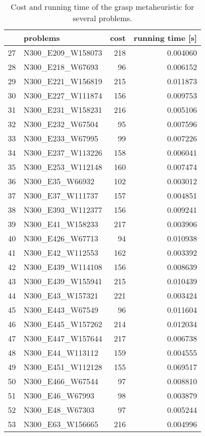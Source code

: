 \begin{table}[H]
\centering
\begin{tabular}{llrr}
\toprule
{} &            problems &  cost &  running time [s] \\
\midrule
27 &   N300\_E209\_W158073 &   218 &          0.004060 \\
28 &    N300\_E218\_W67693 &    96 &          0.006152 \\
29 &   N300\_E221\_W156819 &   215 &          0.011873 \\
30 &   N300\_E227\_W111874 &   156 &          0.009753 \\
31 &   N300\_E231\_W158231 &   216 &          0.005106 \\
32 &    N300\_E232\_W67504 &    95 &          0.007596 \\
33 &    N300\_E233\_W67995 &    99 &          0.007226 \\
34 &   N300\_E237\_W113226 &   158 &          0.006041 \\
35 &   N300\_E253\_W112148 &   160 &          0.007474 \\
36 &     N300\_E35\_W66932 &   102 &          0.003012 \\
37 &    N300\_E37\_W111737 &   157 &          0.004851 \\
38 &   N300\_E393\_W112377 &   156 &          0.009241 \\
39 &    N300\_E41\_W158233 &   217 &          0.003906 \\
40 &    N300\_E426\_W67713 &    94 &          0.010938 \\
41 &    N300\_E42\_W112553 &   162 &          0.003392 \\
42 &   N300\_E439\_W114108 &   156 &          0.008639 \\
43 &   N300\_E439\_W155941 &   215 &          0.010439 \\
44 &    N300\_E43\_W157321 &   221 &          0.003424 \\
45 &    N300\_E443\_W67549 &    96 &          0.011604 \\
46 &   N300\_E445\_W157262 &   214 &          0.012034 \\
47 &   N300\_E447\_W157644 &   217 &          0.006738 \\
48 &    N300\_E44\_W113112 &   159 &          0.004555 \\
49 &   N300\_E451\_W112128 &   155 &          0.069517 \\
50 &    N300\_E466\_W67544 &    97 &          0.008810 \\
51 &     N300\_E46\_W67993 &    98 &          0.003879 \\
52 &     N300\_E48\_W67303 &    97 &          0.005244 \\
53 &    N300\_E63\_W156665 &   216 &          0.004996 \\
\bottomrule
\end{tabular}
\caption{Cost and running time of the grasp metaheuristic for several problems.}
\label{table:ilp-medium-results-II}
\end{table}

